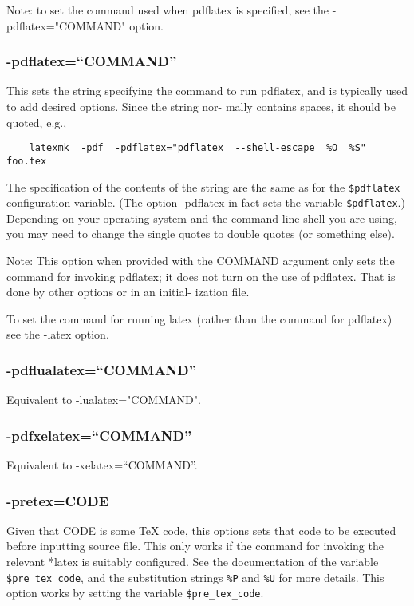 Note:  to  set  the command used when pdflatex is specified, see
the -pdflatex="COMMAND" option.

\subsubsection{-pdflatex=``COMMAND''}

This sets the string specifying the command to run pdflatex, and
is typically used to add desired options.  Since the string nor-
mally contains spaces, it should be quoted, e.g.,

\begin{verbatim}
	latexmk  -pdf  -pdflatex="pdflatex  --shell-escape  %O  %S" foo.tex
\end{verbatim}

The  specification of the contents of the string are the same as for the
\verb|$pdflatex| configuration variable.  (The option -pdflatex in fact sets
the variable \verb|$pdflatex|.)  Depending on your operating system and the
command-line shell you  are  using,  you  may need  to change the single quotes
to double quotes (or something else).

Note: This option when provided with the COMMAND  argument  only
sets  the command for invoking pdflatex; it does not turn on the
use of pdflatex. That is done by other options or in an initial-
ization file.

To  set  the  command for running latex (rather than the command
for pdflatex) see the -latex option.


\subsubsection{-pdflualatex=``COMMAND''}

Equivalent to -lualatex="COMMAND".


\subsubsection{-pdfxelatex=``COMMAND''}

Equivalent to -xelatex=``COMMAND''.


\subsubsection{-pretex=CODE}

Given that CODE is some TeX code, this options sets that code to
be  executed  before  inputting source file.  This only works if the command
for invoking the relevant *latex is suitably configured.   See the
documentation of the variable \verb|$pre_tex_code|, and the substitution
strings \verb|%P| and \verb|%U| for more details.   This  option works by
setting the variable \verb|$pre_tex_code|.

